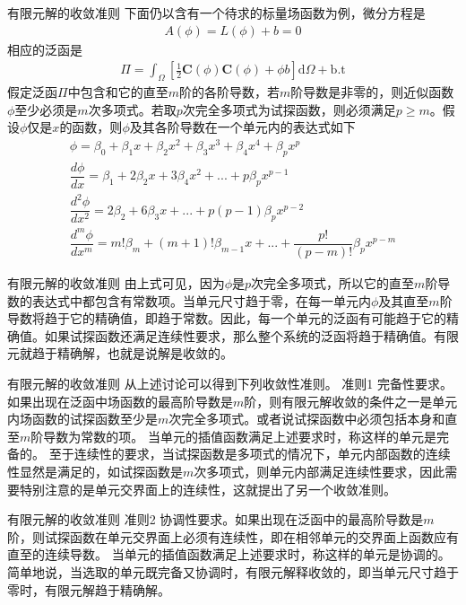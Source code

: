 \documentclass[11pt]{beamer}
\begin{document}
\begin{frame}{有限元解的收敛准则}
下面仍以含有一个待求的标量场函数为例，微分方程是
\begin{align*}
A(\phi)=L(\phi)+b=0
\end{align*}
相应的泛函是
\begin{align*}
\Pi = \int_\Omega\left[\frac{1}{2}\textbf{C}(\phi)\textbf{C}(\phi)+\phi b\right] \mathrm{d}\Omega +\mathrm{b.t}
\end{align*}
假定泛函$\Pi$中包含和它的直至$m$阶的各阶导数，若$m$阶导数是非零的，则近似函数$\phi$至少必须是$m$次多项式。若取$p$次完全多项式为试探函数，则必须满足$p\ge m$。假设$\phi$仅是$x$的函数，则$\phi$及其各阶导数在一个单元内的表达式如下
\begin{align*}
\phi=\beta_{0}+\beta_{1}x+\beta_{2}x^{2}+\beta_{3}x^{3}+\beta_{4}x^{4}+\beta_{p}x^{p}\\
\dfrac{d\phi}{dx}=\beta_{1}+2\beta_{2}x+3\beta_{4}x^{2}+...+p\beta_{p}x^{p-1}\\
\dfrac{d^{2}\phi}{dx^{2}}=2\beta_{2}+6\beta_{3}x+...+p(p-1)\beta_{p}x^{p-2}\\
\dfrac{d^{m}\phi}{dx^{m}}=m!\beta_{m}+(m+1)!\beta_{m-1}x+...+\dfrac{p!}{(p-m)!}\beta_{p}x^{p-m}
\end{align*}
\end{frame}


\begin{frame}{有限元解的收敛准则}
由上式可见，因为$\phi$是$p$次完全多项式，所以它的直至$m$阶导数的表达式中都包含有常数项。当单元尺寸趋于零，在每一单元内$\phi$及其直至$m$阶导数将趋于它的精确值，即趋于常数。因此，每一个单元的泛函有可能趋于它的精确值。如果试探函数还满足连续性要求，那么整个系统的泛函将趋于精确值。有限元就趋于精确解，也就是说解是收敛的。
\end{frame}


\begin{frame}{有限元解的收敛准则}
从上述讨论可以得到下列收敛性准则。
准则1 完备性要求。如果出现在泛函中场函数的最高阶导数是$m$阶，则有限元解收敛的条件之一是单元内场函数的试探函数至少是$m$次完全多项式。或者说试探函数中必须包括本身和直至$m$阶导数为常数的项。
当单元的插值函数满足上述要求时，称这样的单元是完备的。
至于连续性的要求，当试探函数是多项式的情况下，单元内部函数的连续性显然是满足的，如试探函数是$m$次多项式，则单元内部满足连续性要求，因此需要特别注意的是单元交界面上的连续性，这就提出了另一个收敛准则。
\end{frame}


\begin{frame}{有限元解的收敛准则}
准则2 协调性要求。如果出现在泛函中的最高阶导数是$m$阶，则试探函数在单元交界面上必须有连续性，即在相邻单元的交界面上函数应有直至的连续导数。
当单元的插值函数满足上述要求时，称这样的单元是协调的。
简单地说，当选取的单元既完备又协调时，有限元解释收敛的，即当单元尺寸趋于零时，有限元解趋于精确解。
\end{frame}
\end{document}
